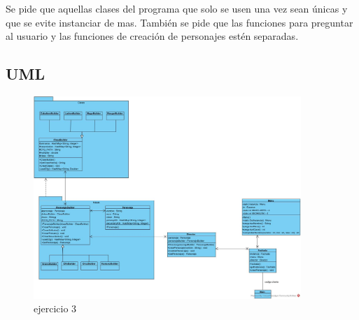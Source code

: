 \documentclass{article}
\begin{document}
Se pide que aquellas clases del programa que solo se usen una vez sean únicas y que se evite instanciar de mas.
También se pide que las funciones para preguntar al usuario y las funciones de creación de personajes estén separadas.

\subsection{UML}

\begin{figure}[H]
	\centering
        \vspace{15pt}
	\includegraphics[width=0.9\textwidth]{DS_ej3.jpg}
	\caption{ejercicio 3}
	\label{fig:ej3}
\end{figure}
\end{document}
